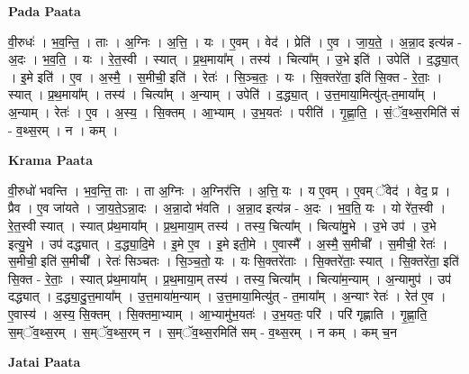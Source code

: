 \documentclass[17pt]{extarticle}
\begin{document}
\textbf{Pada Paata} \newline

वी॒रुधः॑ । भ॒व॒न्ति॒ । ताः । अ॒ग्निः । अ॒त्ति॒ । यः । ए॒वम् । वेद॑ । प्रेति॑ । ए॒व । जा॒य॒ते॒ । अ॒न्ना॒द इत्य॑न्न - अ॒दः । भ॒व॒ति॒ । यः । रे॒त॒स्वी । स्यात् । प्र॒थ॒माया᳚म् । तस्य॑ । चित्या᳚म् । उ॒भे इति॑ । उपेति॑ । द॒द्ध्या॒त् । इ॒मे इति॑ । ए॒व । अ॒स्मै॒ । स॒मीची॒ इति॑ । रेतः॑ । सि॒ञ्च॒तः॒ । यः । सि॒क्तरे॑ता॒ इति॑ सि॒क्त - रे॒ताः॒ । स्यात् । प्र॒थ॒माया᳚म् । तस्य॑ । चित्या᳚म् । अ॒न्याम् । उपेति॑ । द॒द्ध्या॒त् । उ॒त्त॒माया॒मित्यु॑त्-त॒माया᳚म् । अ॒न्याम् । रेतः॑ । ए॒व । अ॒स्य॒ । सि॒क्तम् । आ॒भ्याम् । उ॒भ॒यतः॑ । परीति॑ । गृ॒ह्णा॒ति॒ । सं॒ॅव॒थ्स॒रमिति॑ सं - व॒थ्स॒रम् । न । कम् ।  \newline


\textbf{Krama Paata} \newline

वी॒रुधो॑ भवन्ति । भ॒व॒न्ति॒ ताः । ता अ॒ग्निः । अ॒ग्निर॑त्ति । अ॒त्ति॒ यः । य ए॒वम् । ए॒वम् ॅवेद॑ । वेद॒ प्र । प्रैव । ए॒व जा॑यते । जा॒य॒ते॒ऽन्ना॒दः । अ॒न्ना॒दो भ॑वति । अ॒न्ना॒द इत्य॑न्न - अ॒दः । भ॒व॒ति॒ यः । यो रे॑त॒स्वी । रे॒त॒स्वी स्यात् । स्यात् प्र॑थ॒माया᳚म् । प्र॒थ॒माया॒म् तस्य॑ । तस्य॒ चित्या᳚म् । चित्या॑मु॒भे । उ॒भे उप॑ । उ॒भे इत्यु॒भे । उप॑ दद्ध्यात् । द॒द्ध्या॒दि॒मे । इ॒मे ए॒व । इ॒मे इती॒मे । ए॒वास्मै᳚ । अ॒स्मै॒ स॒मीची᳚ । स॒मीची॒ रेतः॑ । स॒मीची॒ इति॑ स॒मीची᳚ । रेतः॑ सिञ्चतः । सि॒ञ्च॒तो॒ यः । यः सि॒क्तरे॑ताः । सि॒क्तरे॑ताः॒ स्यात् । सि॒क्तरे॑ता॒ इति॑ सि॒क्त - रे॒ताः॒ । स्यात् प्र॑थ॒माया᳚म् । प्र॒थ॒माया॒म् तस्य॑ । तस्य॒ चित्या᳚म् । चित्या॑म॒न्याम् । अ॒न्यामुप॑ । उप॑ दद्ध्यात् । द॒द्ध्या॒दु॒त्त॒माया᳚म् । उ॒त्त॒माया॑म॒न्याम् । उ॒त्त॒माया॒मित्यु॑त् - त॒माया᳚म् । अ॒न्याꣳ रेतः॑ । रेत॑ ए॒व । ए॒वास्य॑ । अ॒स्य॒ सि॒क्तम् । सि॒क्तमा॒भ्याम् । आ॒भ्यामु॑भ॒यतः॑ । उ॒भ॒यतः॒ परि॑ । परि॑ गृह्णाति । गृ॒ह्णा॒ति॒ स॒म्ॅव॒थ्स॒रम् । स॒म्ॅव॒थ्स॒रम् न । स॒म्ॅव॒थ्स॒रमिति॑ सम् - व॒थ्स॒रम् । न कम् । कम् च॒न \newline

\textbf{Jatai Paata} \newline
\end{document}
